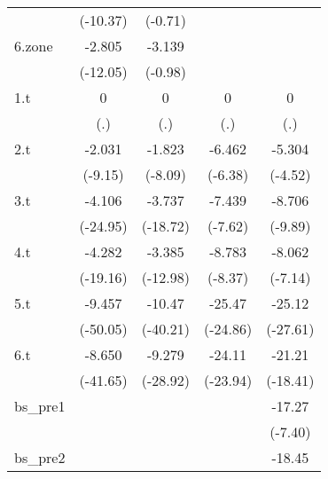 \begin{tabular}{l*{4}{c}}
            &    (-10.37)         &     (-0.71)         &                     &                     \\
[1em]
6.zone      &      -2.805\sym{***}&      -3.139         &                     &                     \\
            &    (-12.05)         &     (-0.98)         &                     &                     \\
[1em]
1.t         &           0         &           0         &           0         &           0         \\
            &         (.)         &         (.)         &         (.)         &         (.)         \\
[1em]
2.t         &      -2.031\sym{***}&      -1.823\sym{***}&      -6.462\sym{***}&      -5.304\sym{***}\\
            &     (-9.15)         &     (-8.09)         &     (-6.38)         &     (-4.52)         \\
[1em]
3.t         &      -4.106\sym{***}&      -3.737\sym{***}&      -7.439\sym{***}&      -8.706\sym{***}\\
            &    (-24.95)         &    (-18.72)         &     (-7.62)         &     (-9.89)         \\
[1em]
4.t         &      -4.282\sym{***}&      -3.385\sym{***}&      -8.783\sym{***}&      -8.062\sym{***}\\
            &    (-19.16)         &    (-12.98)         &     (-8.37)         &     (-7.14)         \\
[1em]
5.t         &      -9.457\sym{***}&      -10.47\sym{***}&      -25.47\sym{***}&      -25.12\sym{***}\\
            &    (-50.05)         &    (-40.21)         &    (-24.86)         &    (-27.61)         \\
[1em]
6.t         &      -8.650\sym{***}&      -9.279\sym{***}&      -24.11\sym{***}&      -21.21\sym{***}\\
            &    (-41.65)         &    (-28.92)         &    (-23.94)         &    (-18.41)         \\
[1em]
bs\_pre1     &                     &                     &                     &      -17.27\sym{***}\\
            &                     &                     &                     &     (-7.40)         \\
[1em]
bs\_pre2     &                     &                     &                     &      -18.45\sym{***}\\

\end{tabular}
